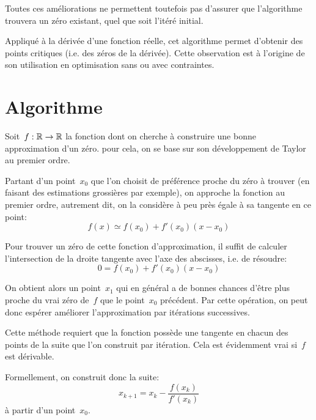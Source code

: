 Toutes ces améliorations ne permettent toutefois pas d'assurer que l'algorithme trouvera un zéro existant, quel que soit l'itéré initial.

\medskip
Appliqué à la dérivée d'une fonction réelle, cet algorithme permet d'obtenir des points critiques (i.e. des zéros de la dérivée). Cette observation est à l'origine de son utilisation en optimisation sans ou avec contraintes.


\medskip
\section{Algorithme}

Soit~$f: \mathbb R\rightarrow\mathbb R$ la fonction dont on cherche à construire une bonne approximation d'un zéro. pour cela, on se base sur son développement de Taylor au premier ordre. 

Partant d'un point~$x_0$ que l'on choisit de préférence proche du zéro à trouver (en faisant des estimations grossières par exemple), on approche la fonction au premier ordre, autrement dit, on la considère à peu près égale à sa tangente en ce point:
\begin{equation} f(x)\simeq f(x_0) + f'(x_0)(x-x_0) \end{equation}

Pour trouver un zéro de cette fonction d'approximation, il suffit de calculer l'intersection de la droite tangente avec l'axe des abscisses, i.e. de résoudre:
\begin{equation} 0=f(x_0) + f'(x_0)(x-x_0) \end{equation}

On obtient alors un point~$x_1$ qui en général a de bonnes chances d'être plus proche du vrai zéro de~$f$ que le point~$x_0$ précédent. Par cette opération, on peut donc espérer améliorer l'approximation par itérations successives.

Cette méthode requiert que la fonction possède une tangente en chacun des points de la suite que l'on construit par itération. Cela est évidemment vrai si~$f$ est dérivable.

\medskip
Formellement, on construit donc la suite:
\begin{equation} x_{k+1} = x_k - \frac{f(x_k)}{f'(x_k)} \end{equation}
à partir d'un point~$x_0$.

